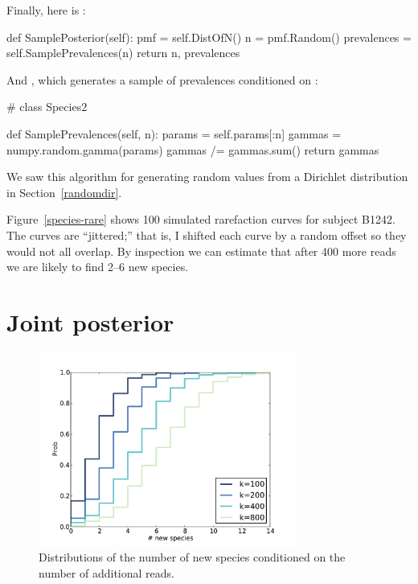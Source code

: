 \documentclass[12pt]{book}
\theoremstyle{exercise}
\begin{document}
Finally, here is :

\begin{code}
    def SamplePosterior(self):
        pmf = self.DistOfN()
        n = pmf.Random()
        prevalences = self.SamplePrevalences(n)
        return n, prevalences
\end{code}

And , which generates a sample of
prevalences conditioned on :

\begin{code}
# class Species2

    def SamplePrevalences(self, n):
        params = self.params[:n]
        gammas = numpy.random.gamma(params)
        gammas /= gammas.sum()
        return gammas
\end{code}

We saw this algorithm for generating random values from a Dirichlet
distribution in Section~\ref{randomdir}.

Figure~\ref{species-rare} shows 100 simulated rarefaction curves
for subject B1242.  The curves are ``jittered;''
that is, I shifted each curve by a random offset so they
would not all overlap.  By inspection we can estimate that after
400 more reads we are likely to find 2--6 new species.


\section{Joint posterior}

\begin{figure}
\centerline{\includegraphics[height=2.5in]{figs/species-cond-B1242.pdf}}
\caption{Distributions of the number of new species conditioned on
the number of additional reads.}
\label{species-cond}
\end{figure}
\end{document}

